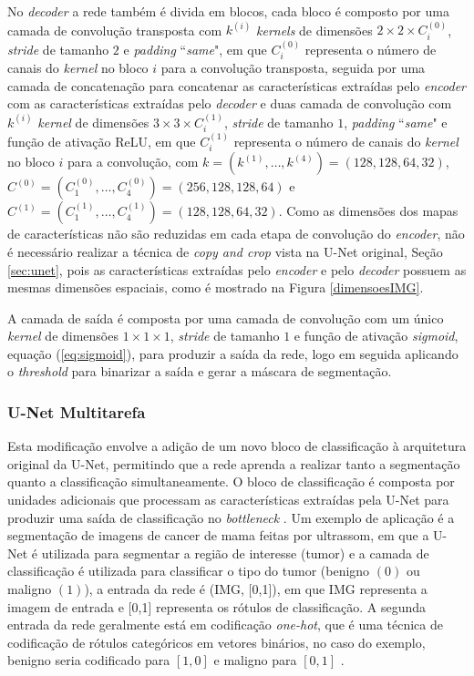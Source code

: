 No \textit{decoder} a rede também é divida em blocos, cada bloco é composto por uma camada de convolução transposta com $k^{(i)}$ \textit{kernels} de dimensões $2\times 2 \times C^{(0)}_i$, \textit{stride} de tamanho $2$ e \textit{padding} ``\textit{same}", em que $C^{(0)}_i$ representa o número de canais do \textit{kernel} no bloco $i$ para a convolução transposta, seguida por uma camada de concatenação para concatenar as características extraídas pelo \textit{encoder} com as características extraídas pelo \textit{decoder} e duas camada de convolução com $k^{(i)}$ \textit{kernel} de dimensões $3\times 3 \times C^{(1)}_i$, \textit{stride} de tamanho $1$, \textit{padding} ``\textit{same}" e função de ativação ReLU, em que $C^{(1)}_i$ representa o número de canais do \textit{kernel} no bloco $i$ para a convolução, com $k = (k^{(1)}, \hdots, k^{(4)}) = (128,128,64,32)$, $C^{(0)} = (C^{(0)}_1, \hdots, C^{(0)}_4) = (256,128,128,64)$ e $C^{(1)} = (C^{(1)}_1, \hdots, C^{(1)}_4) = (128,128,64,32)$. Como as dimensões  dos mapas de características não são reduzidas em cada etapa de convolução do \textit{encoder}, não é necessário realizar a técnica de \textit{copy and crop} vista na U-Net original, Seção \ref{sec:unet}, pois as características extraídas pelo \textit{encoder} e pelo \textit{decoder} possuem as mesmas dimensões espaciais, como é mostrado na Figura \ref{dimensoesIMG}.

A camada de saída é composta por uma camada de convolução com um único \textit{kernel} de dimensões $1\times 1 \times 1$, \textit{stride} de tamanho $1$ e função de ativação \textit{sigmoid}, equação (\ref{eq:sigmoid}), para produzir a saída da rede, logo em seguida aplicando o \textit{threshold} para binarizar a saída e gerar a máscara de segmentação. 


\subsubsection{U-Net Multitarefa}

Esta modificação envolve a adição de um novo bloco de classificação à arquitetura original da U-Net, permitindo que a rede aprenda a realizar tanto a segmentação quanto a classificação simultaneamente. O bloco de classificação é composta por unidades adicionais que processam as características extraídas pela U-Net para produzir uma saída de classificação no \textit{bottleneck} \cite{Zhu2022}. Um exemplo de aplicação é a segmentação de imagens de cancer de mama feitas por ultrassom, em que a U-Net é utilizada para segmentar a região de interesse (tumor) e a camada de classificação é utilizada para classificar o tipo do tumor (benigno $(0)$ ou maligno $(1)$), a entrada da rede é (IMG, [0,1]), em que IMG representa a imagem de entrada e [0,1] representa os rótulos de classificação. A segunda entrada da rede geralmente está em  codificação \textit{one-hot}, que é uma técnica de codificação de rótulos categóricos em vetores binários, no caso do exemplo, benigno seria codificado para $[1,0]$ e maligno para $[0,1]$  \cite{onehot}. 

